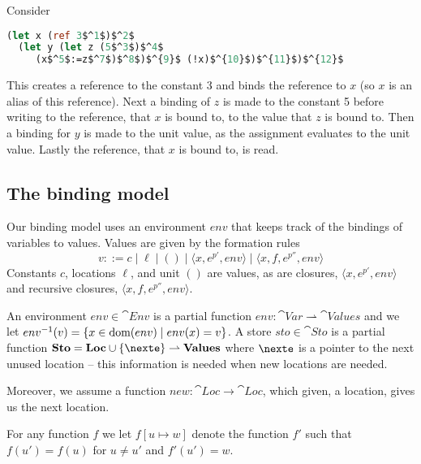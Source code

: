 \documentclass{eptcs}
\begin{document}
\begin{example}\label{ex:write}
Consider
\begin{lstlisting}[language=Caml, mathescape=true]
  (let x (ref 3$^1$)$^2$
  (let y (let z (5$^3$)$^4$
     (x$^5$:=z$^7$)$^8$)$^{9}$ (!x)$^{10}$)$^{11}$)$^{12}$
\end{lstlisting}
This creates a reference to the constant 3 and binds the reference to
$x$ (so $x$ is an alias of this reference). Next a binding of $z$ is made
to the constant 5 before writing to the reference, that $x$ is bound to, 
to the value that $z$ is bound to. Then a binding for $y$ is made to the unit value,
as the assignment evaluates to the unit value. Lastly the reference, that $x$ is bound to, is read.

\end{example}

\subsection{The binding model}\label{sec:EnvSto}

Our binding model uses an environment $env$ that keeps
track of the bindings of variables to values. Values are given by the formation rules
%
\[ v ::= c \mid \ell \mid () \mid \langle x,e^{p'},env\rangle \mid \langle
  x,f,e^{p''},env\rangle \]
%
Constants $c$, locations $\ell$, and unit $()$ are values, as are closures, $\langle
x,e^{p'},env\rangle$ and recursive closures, $\langle x,f,e^{p''},env\rangle$.

An environment $env \in \cat{Env} $ is a partial function $env:
\cat{Var}\rightharpoonup\cat{Values}$ and we let $env^{-1}(v)=\{x\in \textrm{dom}(env)\mid env(x)=v\}$.
%
A store $sto \in \cat{Sto}$ is a partial function
$\cat{Sto}=\cat{Loc}\cup\{\nexte\}\rightharpoonup\cat{Values}$ where
$\nexte$ is a pointer to the next unused location -- this information
is needed when new locations are needed.

Moreover, we assume a function
$new:\cat{Loc}\rightarrow\cat{Loc}$, which given, a location, gives us
the next location.

For any function $f$ we let $f[u
\mapsto w]$ denote the function $f'$ such that $f(u') = f(u)$ for $u
\neq u'$ and $f'(u') = w$.
\end{document}
